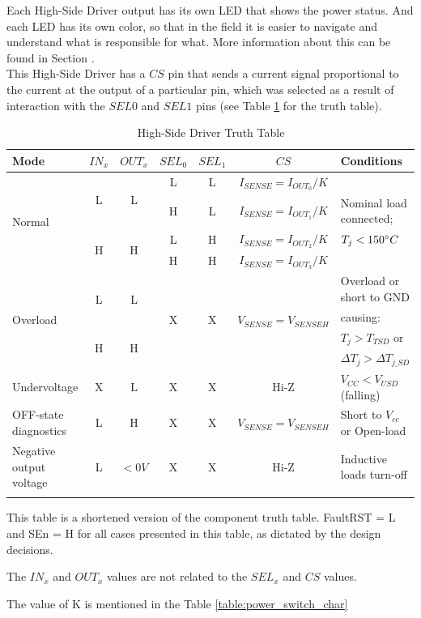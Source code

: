 \documentclass[10pt]{datasheet}
\begin{document}
Each High-Side Driver output has its own LED that shows the power status. And each LED has its own color, so that in the field it is easier to navigate and understand what is responsible for what. More information about this can be found in Section . \\
This High-Side Driver has a $CS$ pin that sends a current signal proportional to the current at the output of a particular pin, which was selected as a result of interaction with the $SEL0$ and $SEL1$ pins (see Table \ref{table:power_switch_truth_table} for the truth table).
\begin{table}[H]
\begin{threeparttable}
\caption{High-Side Driver Truth Table}
\label{table:power_switch_truth_table}
\begin{tabularx}{\textwidth}{l | c | c | c c | c | X}
    \thickhline
    \textbf{Mode} & \textbf{$IN_x$} & \textbf{$OUT_x$} & \textbf{$SEL_0$} & \textbf{$SEL_1$} &
    \textbf{$CS$}\tnote{3} & \textbf{Conditions} \\
    \hline
    \multirow{4}{*}{Normal\tnote{2}} & \multirow{2}{*}{L} & \multirow{2}{*}{L} & L & L & $I_{SENSE} = I_{OUT_0}/K$ & \\
    \cline{4-6}
    & & & H & L &$I_{SENSE} = I_{OUT_1}/K$ & Nominal load connected;\\
    \cline{4-6}
    & \multirow{2}{*}{H} & \multirow{2}{*}{H} & L & H & $I_{SENSE} = I_{OUT_2}/K$ & $T_j < 150\degree C$\\
    \cline{4-6}
    & & & H & H & $I_{SENSE} = I_{OUT_3}/K$ & \\
    \hline
    \multirow{4}{*}{Overload} & \multirow{2}{*}{L} & \multirow{2}{*}{L} & \multirow{4}{*}{X} & \multirow{4}{*}{X} & \multirow{4}{*}{$V_{SENSE} = V_{SENSEH}$} & Overload or short to GND\\
    & & & & & & causing:\\
    & \multirow{2}{*}{H} & \multirow{2}{*}{H} & & & & $T_j>T_{TSD}$ or \\
    & & & & & & $\Delta T_j>\Delta T_{j\_SD}$\\
    \hline
    Undervoltage & X & L & X & X & Hi-Z & $V_{CC} < V_{USD}$ (falling) \\
    \hline
    OFF-state diagnostics & L & H & X & X & $V_{SENSE} = V_{SENSEH}$ & Short to $V_{cc}$ or Open-load \\
    \hline
    Negative output voltage & L &$<0V$ & X & X & Hi-Z & Inductive loads turn-off \\
    \hline
    \thickhline
\end{tabularx}
\begin{tablenotes}
\item[1] {This table is a shortened version of the component truth table. FaultRST = L and SEn = H for all cases presented in this table, as dictated by the design decisions.}
\item[2] {The $IN_x$ and $OUT_x$ values are not related to the $SEL_x$ and $CS$ values.}
\item[3] {The value of K is mentioned in the Table \ref{table:power_switch_char}}
\end{tablenotes}
\end{threeparttable}
\end{table}
\end{document}
